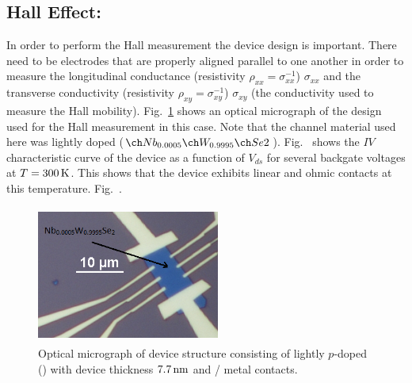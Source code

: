 \subsection{Hall Effect: \lightlyfive}\label{subsec:hall_lightly}
In order to perform the Hall measurement the device design is important. There need to be electrodes that are properly aligned parallel to one another in order to measure the longitudinal conductance (resistivity $\rho_{xx}=\sigma_{xx}^{-1}$) $\sigma_{xx}$ and the transverse conductivity (resistivity $\rho_{xy}=\sigma_{xy}^{-1}$) $\sigma_{xy}$ (the conductivity used to measure the Hall mobility). Fig.~\ref{fig:hall_bar_device1} shows an optical micrograph of the design used for the Hall measurement in this case. Note that the channel material used here was lightly doped  ($\lightlyfive$). Fig.~ shows the $IV$ characteristic curve of the device as a function of $V_{ds}$ for several backgate voltages at $T=300\,\mathrm{K}$. This shows that the device exhibits linear and ohmic contacts at this temperature. Fig.~.
\begin{figure}[ht]
	\centering
	\includegraphics[height=4.5cm,width=6.0cm]{figs/results/hall_bar_doped_channel/hall_bar_device_pic_11192015_no2_doping_scheme}
	\caption[Hall bar device optical micrograph using \lightlyfive]{Optical micrograph of device structure consisting of lightly $p$-doped  (\lightlyfive) with device thickness $7.7\,\mathrm{nm}$ and / metal contacts.}
	\label{fig:hall_bar_device1}
\end{figure}

